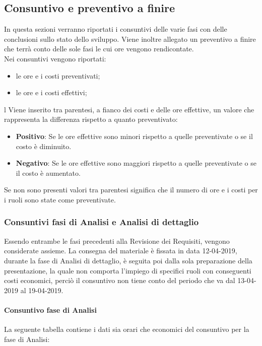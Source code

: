 \subsection{Consuntivo e preventivo a finire}
In questa sezioni verranno riportati i consuntivi delle varie fasi con delle conclusioni sullo stato dello sviluppo. Viene inoltre allegato un preventivo a finire che terrà conto delle sole fasi le cui ore vengono rendicontate. \\
Nei consuntivi vengono riportati:
\begin{itemize}
    \item le ore e i costi preventivati;
    \item le ore e i costi effettivi;
\end{itemize}l
Viene inserito tra parentesi, a fianco dei costi e delle ore effettive, un valore che rappresenta la differenza rispetto a quanto preventivato:  
\begin{itemize}
    \item \textbf{Positivo}: Se le ore effettive sono minori rispetto a quelle preventivate o se il costo è diminuito.
    \item \textbf{Negativo}: Se le ore effettive sono maggiori rispetto a quelle preventivate o se il costo è aumentato.
\end{itemize}
Se non sono presenti valori tra parentesi significa che il numero di ore e i costi per i ruoli sono state come preventivate.
\subsubsection{Consuntivi fasi di Analisi e Analisi di dettaglio}
Essendo entrambe le fasi precedenti alla Revisione dei Requisiti, vengono considerate assieme. La consegna del materiale è fissata in data 12-04-2019, durante la fase di Analisi di dettaglio, è seguita poi dalla sola preparazione della presentazione, la quale non comporta l'impiego di specifici ruoli con conseguenti costi economici, perciò il consuntivo non tiene conto del periodo che va dal 13-04-2019 al 19-04-2019.

\newpage

\paragraph{Consuntivo fase di Analisi}
La seguente tabella contiene i dati sia orari che economici del consuntivo per la fase di Analisi:

